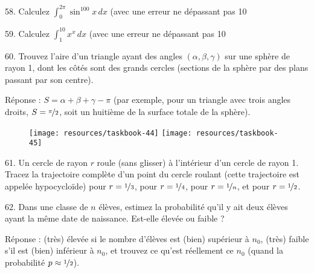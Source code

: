 \begin{problem}{58.}
    Calculez $\int_0^{2\pi} \sin^{100} x\,dx$ (avec une erreur ne dépassant pas 10 %
\end{problem}

\begin{problem}{59.}
    Calculez $\int_1^{10} x^x\,dx$ (avec une erreur ne dépassant pas 10 %
\end{problem}

\begin{problem}{60.}
    Trouvez l'aire d'un triangle ayant des angles $(\alpha, \beta, \gamma)$ sur une sphère de rayon 1,
    dont les côtés sont des grands cercles (sections de la sphère par des plans passant par son centre).

    \begin{note}{Réponse :}
        $S=\alpha+\beta+\gamma-\pi$ (par exemple, pour un triangle avec
        trois angles droits, $S=\nicefrac{\pi}{2}$, soit un huitième de la surface totale de la sphère).
        \begin{figure}
            \null\hfill
            \texttt{[image: resources/taskbook-44]}
            \hfill
            \texttt{[image: resources/taskbook-45]}
            \hfill\null
        \end{figure}
    \end{note}
\end{problem}

\begin{problem}{61.}
    Un cercle de rayon $r$ roule (sans glisser) à l'intérieur d’un cercle de rayon 1.
    Tracez la trajectoire complète d’un point du cercle roulant (cette trajectoire est appelée hypocycloïde)
    pour $r=\nicefrac{1}{3}$, pour $r=\nicefrac{1}{4}$, pour $r=\nicefrac{1}{n}$, et pour $r=\nicefrac{1}{2}$.
\end{problem}

\begin{problem}{62.}
    Dans une classe de $n$ élèves, estimez la probabilité qu’il y ait deux élèves ayant la même date de naissance. Est-elle élevée ou faible ?

    \begin{note}{Réponse :}
        (très) élevée si le nombre d’élèves est (bien) supérieur à $n_0$,
        (très) faible s’il est (bien) inférieur à $n_0$, et trouvez ce qu’est réellement ce $n_0$
        (quand la probabilité $p \approx \nicefrac{1}{2}$).
    \end{note}
\end{problem}

